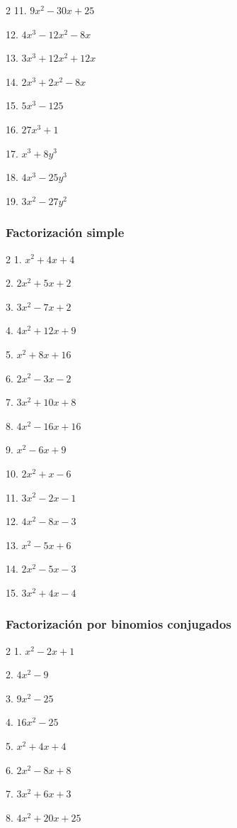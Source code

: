 \documentclass[12pt]{article}
\begin{document}
{\begin{multicols}{2}
11. $9x^2 - 30x + 25$

12. $4x^3 - 12x^2 - 8x$


13. $3x^3 + 12x^2 + 12x$

14. $2x^3 + 2x^2 - 8x$

15. $5x^3 - 125$

16. $27x^3 + 1$

17. $x^3 + 8y^3$

18. $4x^3 - 25y^3$

19. $3x^2 - 27y^2$
\end{multicols}

\subsubsection{Factorización simple}\label{factorizaciuxf3n-simple}
\begin{multicols}{2}
1. $x^2 + 4x + 4$

2. $2x^2 + 5x + 2$

3. $3x^2 - 7x + 2$

4. $4x^2 + 12x + 9$

5. $x^2 + 8x + 16$

6. $2x^2 - 3x - 2$

7. $3x^2 + 10x + 8$

8. $4x^2 - 16x + 16$

9. $x^2 - 6x + 9$

10. $2x^2 + x - 6$

11. $3x^2 - 2x - 1$

12. $4x^2 - 8x - 3$

13. $x^2 - 5x + 6$

14. $2x^2 - 5x - 3$

15. $3x^2 + 4x - 4$
\end{multicols}

\subsubsection{Factorización por binomios
conjugados}\label{factorizaciuxf3n-por-binomios-conjugados}
\begin{multicols}{2}
1. $x^2 - 2x + 1$

2. $4x^2 - 9$

3. $9x^2 - 25$

4. $16x^2 - 25$

5. $x^2 + 4x + 4$

6. $2x^2 - 8x + 8$

7. $3x^2 + 6x + 3$

8. $4x^2 + 20x + 25$


\end{multicols}}
\end{document}
